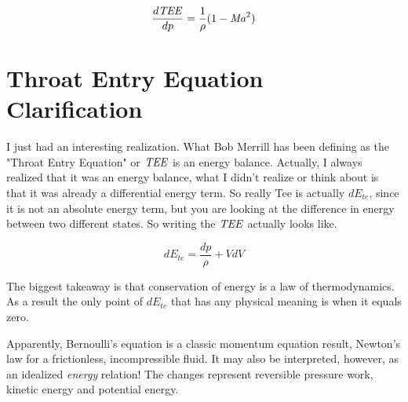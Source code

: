 \documentclass{article}
\newcommand\Mach{\mbox{\textit{Ma}}}  %
\newcommand\Tee{\mbox{\textit{TEE}}}  %
\begin{document}
\begin{equation}
    \frac{d\Tee}{dp} = \frac{1}{\rho}(1 - \Mach^2)
\end{equation}

\section{Throat Entry Equation Clarification}

I just had an interesting realization. What Bob Merrill has been defining as the "Throat Entry Equation" or $\Tee$ is an energy balance. Actually, I always realized that it was an energy balance, what I didn't realize or think about is that it was already a differential energy term. So really Tee is actually $dE_{te}$, since it is not an absolute energy term, but you are looking at the difference in energy between two different states. So writing the $\Tee$ actually looks like.

\begin{equation}
    dE_{te} = \frac{dp}{\rho} + VdV
\end{equation}

The biggest takeaway is that conservation of energy is a law of thermodynamics. As a result the only point of $dE_{te}$ that has any physical meaning is when it equals zero.

Apparently, Bernoulli's equation is a classic momentum equation result, Newton's law for a frictionless, incompressible fluid. It may also be interpreted, however, as an idealized \emph{energy} relation! The changes represent reversible pressure work, kinetic energy and potential energy.
\end{document}
